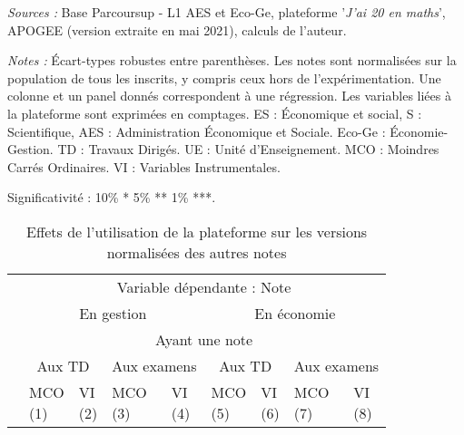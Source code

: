\documentclass[
]{book}
\begin{document}
\begingroup\fontsize{8}{10}\selectfont

\begin{ThreePartTable}
\begin{TableNotes}
\item \textit{Sources :} Base Parcoursup - L1 AES et Eco-Ge, plateforme '\textit{J'ai 20 en maths}', APOGEE (version extraite en mai 2021), calculs de l'auteur.
\item \textit{Notes :} Écart-types robustes entre parenthèses. 
    Les notes sont normalisées sur la population de tous les inscrits, y compris ceux hors de l'expérimentation. Une colonne et un panel donnés correspondent à une régression. Les variables liées à la plateforme sont exprimées en comptages. ES : Économique et social, S : Scientifique, AES : Administration Économique et Sociale. Eco-Ge : Économie-Gestion. TD : Travaux Dirigés. UE : Unité d'Enseignement. MCO : Moindres Carrés Ordinaires. VI : Variables Instrumentales.
\item Significativité : 10\% * 5\% ** 1\% ***.
\end{TableNotes}
\begin{longtable}[t]{lllllllll}
\caption{\label{tab:g20modelsautresnotesnormpop}Effets de l'utilisation de la plateforme sur les versions normalisées des autres notes}\\
\toprule
\multicolumn{1}{c}{ } & \multicolumn{8}{c}{Variable dépendante : Note } \\
\cmidrule(l{3pt}r{3pt}){2-9}
\multicolumn{1}{c}{ } & \multicolumn{4}{c}{En gestion} & \multicolumn{4}{c}{En économie} \\
\cmidrule(l{3pt}r{3pt}){2-5} \cmidrule(l{3pt}r{3pt}){6-9}
\multicolumn{1}{c}{ } & \multicolumn{8}{c}{Ayant une note } \\
\cmidrule(l{3pt}r{3pt}){2-9}
\multicolumn{1}{c}{ } & \multicolumn{2}{c}{Aux TD} & \multicolumn{2}{c}{Aux examens} & \multicolumn{2}{c}{Aux TD} & \multicolumn{2}{c}{Aux examens} \\
\cmidrule(l{3pt}r{3pt}){2-3} \cmidrule(l{3pt}r{3pt}){4-5} \cmidrule(l{3pt}r{3pt}){6-7} \cmidrule(l{3pt}r{3pt}){8-9}
  & \makecell{MCO \\ (1) } & \makecell{VI \\ (2) } & \makecell{MCO \\ (3) } & \makecell{VI \\ (4) } & \makecell{MCO \\ (5) } & \makecell{VI \\ (6) } & \makecell{MCO \\ (7) } & \makecell{VI \\ (8) }\\

\end{longtable}
\end{ThreePartTable}
\end{document}
